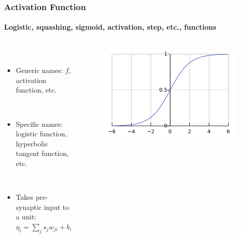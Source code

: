 \documentclass{beamer}
\newcommand{\figheight}{0.72\textheight}
\begin{document}
\begin{frame}[fragile]
\frametitle{Activation Function}
\framesubtitle{Logistic, squashing, sigmoid, activation, step, etc., functions}
 \begin{columns}[T]
    \begin{column}{.45\textwidth} 
             \  \\

     
\begin{itemize}[<+->]

\item Generic  names: $f$, activation function, etc.

\ \\

\item Specific names: logistic function, hyperbolic tangent function, etc.


\ \\

\item Takes pre-synaptic input to a unit:
$ \eta_{i}= \sum_{j} s_jw_{ji} + b_i $



 
\end{itemize}
\end{column}
\begin{column}{.55\textwidth}
\begin{figure}[t]
 \begin{flushleft}

 \includegraphics[scale=.4]{fig/Logistic-curve.pdf}


 \end{flushleft}
\end{figure}
\end{column}

\end{columns}
\end{frame}
\end{document}
